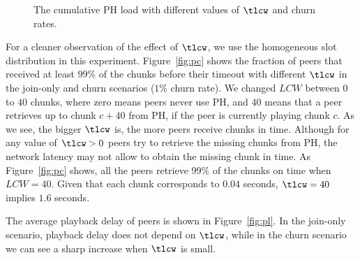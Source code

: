{\begin{figure}[t]
\caption{\small The cumulative PH load with different values of $\tlcw$ and churn rates.}
\label{fig:ph-load}
\end{figure}

For a cleaner observation of the effect of $\tlcw$, we use the homogeneous
slot distribution in this experiment. Figure~\ref{fig:pc} shows the fraction
of peers that received at least $99\%$ of the chunks before their timeout with
different $\tlcw$ in the join-only and churn scenarios ($1\%$ churn rate). We
changed $LCW$ between $0$ to $40$ chunks, where zero means peers never use PH,
and $40$ means that a peer retrieves up to chunk $c+40$ from PH, if the peer
is currently playing chunk $c$. As we see, the bigger $\tlcw$ is, the more
peers receive chunks in time. Although for any value of $\tlcw>0$ peers try to
retrieve the missing chunks from PH, the network latency may not allow to
obtain the missing chunk in time. As Figure~\ref{fig:pc} shows, all the peers
retrieve 99\% of the chunks on time when $LCW=40$. Given that each chunk
corresponds to $0.04$ seconds, $\tlcw=40$ implies $1.6$ seconds.

The average playback delay of peers is shown in Figure~\ref{fig:pl}. In the
join-only scenario, playback delay does not depend on $\tlcw$, while in the
churn scenario we can see a sharp increase when $\tlcw$ is small.

}
